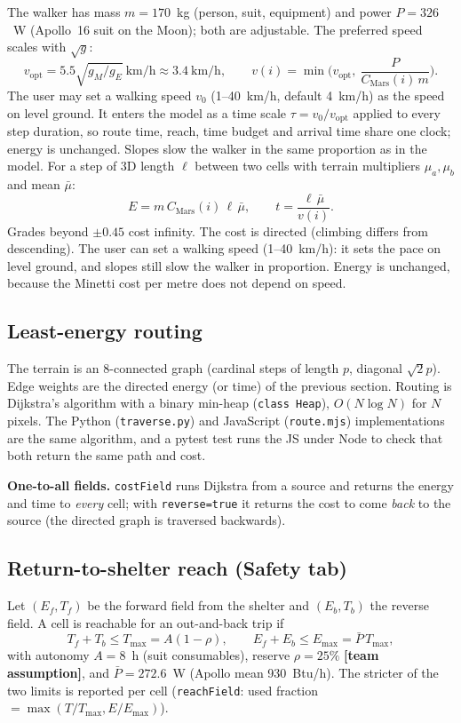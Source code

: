 \documentclass[11pt,a4paper]{article}
\newcommand{\hyp}[1]{\textcolor{marsred}{\textbf{[#1]}}}   %
\renewcommand{\_}{\textunderscore\allowbreak}
\newcommand{\code}[1]{\texttt{#1}}
\begin{document}
The walker has mass $m=170$~kg (person, suit, equipment) and power $P=326$~W (Apollo~16 suit on the Moon); both are adjustable. The preferred speed scales with $\sqrt{g}$:
\[
v_\text{opt}=5.5\sqrt{g_M/g_E}\ \text{km/h}\approx3.4\ \text{km/h},\qquad
v(i)=\min\!\Big(v_\text{opt},\ \frac{P}{C_\text{Mars}(i)\,m}\Big).
\]
The user may set a walking speed $v_0$ (1--40~km/h, default 4~km/h) as the speed on level ground. It enters the model as a time scale $\tau=v_0/v_\text{opt}$ applied to every step duration, so route time, reach, time budget and arrival time share one clock; energy is unchanged. Slopes slow the walker in the same proportion as in the model.
For a step of 3D length $\ell$ between two cells with terrain multipliers $\mu_a,\mu_b$ and mean $\bar\mu$:
\[
E=m\,C_\text{Mars}(i)\,\ell\,\bar\mu,\qquad t=\frac{\ell\,\bar\mu}{v(i)}.
\]
Grades beyond $\pm0.45$ cost infinity. The cost is directed (climbing differs from descending). The user can set a walking speed (1--40~km/h): it sets the pace on level ground, and slopes still slow the walker in proportion. Energy is unchanged, because the Minetti cost per metre does not depend on speed.

\subsection{Least-energy routing}
The terrain is an 8-connected graph (cardinal steps of length $p$, diagonal $\sqrt2p$). Edge weights are the directed energy (or time) of the previous section. Routing is Dijkstra's algorithm with a binary min-heap (\code{class Heap}), $O(N\log N)$ for $N$ pixels. The Python (\code{traverse.py}) and JavaScript (\code{route.mjs}) implementations are the same algorithm, and a pytest test runs the JS under Node to check that both return the same path and cost.

\textbf{One-to-all fields.} \code{costField} runs Dijkstra from a source and returns the energy and time to \emph{every} cell; with \code{reverse=true} it returns the cost to come \emph{back} to the source (the directed graph is traversed backwards).

\subsection{Return-to-shelter reach (Safety tab)}
Let $(E_f,T_f)$ be the forward field from the shelter and $(E_b,T_b)$ the reverse field. A cell is reachable for an out-and-back trip if
\[
T_f+T_b\le T_\text{max}=A(1-\rho),\qquad E_f+E_b\le E_\text{max}=\bar P\,T_\text{max},
\]
with autonomy $A=8$~h (suit consumables), reserve $\rho=25\%$ \hyp{team assumption}, and $\bar P=272.6$~W (Apollo mean 930~Btu/h). The stricter of the two limits is reported per cell (\code{reachField}: used fraction $=\max(T/T_\text{max},E/E_\text{max})$).
\end{document}
